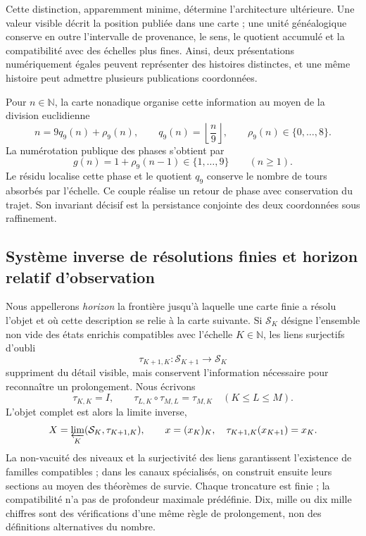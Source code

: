 Cette distinction, apparemment minime, détermine l'architecture ultérieure.
Une valeur visible décrit la position publiée dans une carte ; une unité
généalogique conserve en outre l'intervalle de provenance, le sens, le
quotient accumulé et la compatibilité avec des échelles plus fines. Ainsi, deux
présentations numériquement égales peuvent représenter des histoires distinctes,
et une même histoire peut admettre plusieurs publications coordonnées.

Pour \(n\in\mathbb N\), la carte nonadique organise cette information au moyen de
la division euclidienne
\begin{equation}\label{p12-83-c0-s1:eq:horizonte-division-nonadica}
 n=9q_9(n)+\rho_9(n),
 \qquad q_9(n)=\left\lfloor\frac n9\right\rfloor,
 \qquad \rho_9(n)\in\{0,\ldots,8\}.
\end{equation}
La numérotation publique des phases s'obtient par
\[
 g(n)=1+\rho_9(n-1)\in\{1,\ldots,9\}\qquad(n\geq1).
\]
Le résidu localise cette phase et le quotient \(q_9\) conserve le nombre de tours
absorbés par l'échelle. Ce couple réalise un retour de phase
avec conservation du trajet. Son invariant décisif est la persistance
conjointe des deux coordonnées sous raffinement.

\subsection*{Système inverse de résolutions finies et horizon relatif d'observation}

Nous appellerons \emph{horizon} la frontière jusqu'à laquelle une carte finie a
résolu l'objet et où cette description se relie à la carte
suivante. Si
\(\mathcal S_K\) désigne l'ensemble non vide des états enrichis
compatibles avec l'échelle \(K\in\mathbb N\), les liens surjectifs
d'oubli
\[
 \tau_{K+1,K}:\mathcal S_{K+1}\longrightarrow\mathcal S_K
\]
suppriment du détail visible, mais conservent l'information nécessaire pour
reconnaître un prolongement. Nous écrivons
\[
 \tau_{K,K}=I,\qquad
 \tau_{L,K}\circ\tau_{M,L}=\tau_{M,K}
 \quad(K\leq L\leq M).
\]
L'objet complet est alors la limite inverse,
\begin{equation}\label{p12-83-c0-s1:eq:horizonte-limite-inverso}
 X=\varprojlim_K(\mathcal S_K,\tau_{K+1,K}),
 \qquad
 x=(x_K)_K,\quad \tau_{K+1,K}(x_{K+1})=x_K.
\end{equation}
La non-vacuité des niveaux et la surjectivité des liens garantissent
l'existence de familles compatibles ; dans les canaux spécialisés, on
construit ensuite leurs sections au moyen des théorèmes de survie.
Chaque troncature est finie ; la compatibilité n'a pas de profondeur
maximale prédéfinie. Dix, mille ou dix mille chiffres sont des vérifications d'une même
règle de prolongement, non des définitions alternatives du nombre.

